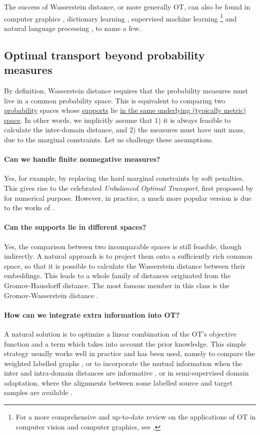 The success of Wasserstein distance, or more generally OT, can also be found in
computer graphics \citep{Bonneel16,Solomon15}, dictionary learning \citep{Rolet16},
supervised machine learning \citep{Frogner15}
\footnote{For a more comprehensive and up-to-date review on the applications of OT in
computer vision and computer graphics, see \citep{Bonneel23}.} and
natural language processing \citep{Kusner15}, to name a few.

\subsection{Optimal transport beyond probability measures}

By definition, Wasserstein distance requires that the probability measures
must live in a common probability space. This is equivalent to comparing two
\underline{probability} spaces whose \underline{supports} lie
\underline{in the same underlying (typically metric) space}.
In other words, we implicitly assume that 1) it is always feasible to calculate
the inter-domain distance, and 2) the measures must have unit mass, due to the marginal constraints.
Let us challenge these assumptions.

\paragraph{Can we handle finite nonnegative measures?} Yes, for example,
by replacing the hard marginal constraints by soft penalties.
This gives rise to the celebrated \textit{Unbalanced Optimal Transport}, first proposed by
\citep{Benamou03} for numerical purpose. However, in practice, a much more popular version
is due to the works of \citep{Liero18,Frogner15}.

\paragraph{Can the supports lie in different spaces?} Yes, the comparison between
two incomparable spaces is still feasible, though indirectly. A natural approach is to project them
onto a sufficiently rich common space, so that it is possible to calculate the Wasserstein distance
between their embeddings. This leads to a whole family of distances originated from
the Gromov-Hausdorff distance. The most famous member in this class is
the Gromov-Wasserstein distance \citep{Memoli07,Memoli11}.

\paragraph{How can we integrate extra information into OT?} A natural solution is to optimize
a linear combination of the OT's objective function and a term which takes into account the
prior knowledge. This simple strategy usually works well in practice and has been used, namely to
compare the weighted labelled graphs \citep{Vayer19b}, or to incorporate the mutual information
when the inter and intra-domain distances are informative \citep{Chuang23},
or in semi-supervised domain adaptation, where the alignments between some labelled source
and target samples are available \citep{Gu22}.

